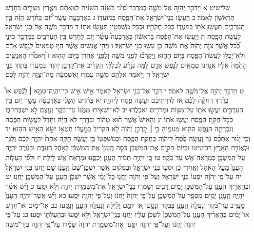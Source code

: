 \documentclass[twoside, openany, parskip=half, 11pt]{book}
\begin{document}
שלישיט א וַיְדַבֵּ֣ר יְהֹוָ֣ה אֶל־מֹשֶׁ֣ה בְמִדְבַּר־סִ֠ינַ֠י בַּשָּׁנָ֨ה הַשֵּׁנִ֜ית לְצֵאתָ֨ם מֵאֶ֧רֶץ מִצְרַ֛יִם בַּחֹ֥דֶשׁ הָרִאשׁ֖וֹן לֵאמֹֽר׃ ב וְיַעֲשׂ֧וּ בְנֵי־יִשְׂרָאֵ֛ל אֶת־הַפָּ֖סַח בְּמוֹעֲדֽוֹ׃ ג בְּאַרְבָּעָ֣ה עָשָֽׂר־י֠וֹם בַּחֹ֨דֶשׁ הַזֶּ֜ה בֵּ֧ין הָֽעַרְבַּ֛יִם תַּעֲשׂ֥וּ אֹת֖וֹ בְּמֹעֲד֑וֹ כְּכׇל־חֻקֹּתָ֥יו וּכְכׇל־מִשְׁפָּטָ֖יו תַּעֲשׂ֥וּ אֹתֽוֹ׃ ד וַיְדַבֵּ֥ר מֹשֶׁ֛ה אֶל־בְּנֵ֥י יִשְׂרָאֵ֖ל לַעֲשֹׂ֥ת הַפָּֽסַח׃ ה וַיַּעֲשׂ֣וּ אֶת־הַפֶּ֡סַח בָּרִאשׁ֡וֹן בְּאַרְבָּעָה֩ עָשָׂ֨ר י֥וֹם לַחֹ֛דֶשׁ בֵּ֥ין הָעַרְבַּ֖יִם בְּמִדְבַּ֣ר סִינָ֑י כְּ֠כֹ֠ל אֲשֶׁ֨ר צִוָּ֤ה יְהֹוָה֙ אֶת־מֹשֶׁ֔ה כֵּ֥ן עָשׂ֖וּ בְּנֵ֥י יִשְׂרָאֵֽל׃ ו וַיְהִ֣י אֲנָשִׁ֗ים אֲשֶׁ֨ר הָי֤וּ טְמֵאִים֙ לְנֶ֣פֶשׁ אָדָ֔ם וְלֹא־יָכְל֥וּ לַעֲשֹׂת־הַפֶּ֖סַח בַּיּ֣וֹם הַה֑וּא וַֽיִּקְרְב֞וּ לִפְנֵ֥י מֹשֶׁ֛ה וְלִפְנֵ֥י אַהֲרֹ֖ן בַּיּ֥וֹם הַהֽוּא׃ ז וַ֠יֹּאמְר֠וּ הָאֲנָשִׁ֤ים הָהֵ֙מָּה֙ אֵלָ֔יו אֲנַ֥חְנוּ טְמֵאִ֖ים לְנֶ֣פֶשׁ אָדָ֑ם לָ֣מָּה נִגָּרַ֗ע לְבִלְתִּ֨י הַקְרִ֜יב אֶת־קׇרְבַּ֤ן יְהֹוָה֙ בְּמֹ֣עֲד֔וֹ בְּת֖וֹךְ בְּנֵ֥י יִשְׂרָאֵֽל׃ ח וַיֹּ֥אמֶר אֲלֵהֶ֖ם מֹשֶׁ֑ה עִמְד֣וּ וְאֶשְׁמְעָ֔ה מַה־יְצַוֶּ֥ה יְהֹוָ֖ה לָכֶֽם׃

ט וַיְדַבֵּ֥ר יְהֹוָ֖ה אֶל־מֹשֶׁ֥ה לֵּאמֹֽר׃ י דַּבֵּ֛ר אֶל־בְּנֵ֥י יִשְׂרָאֵ֖ל לֵאמֹ֑ר אִ֣ישׁ אִ֣ישׁ כִּי־יִהְיֶֽה־טָמֵ֣א ׀ לָנֶ֡פֶשׁ אוֹ֩ בְדֶ֨רֶךְ רְחֹקָ֜הׄ לָכֶ֗ם א֚וֹ לְדֹרֹ֣תֵיכֶ֔ם וְעָ֥שָׂה פֶ֖סַח לַיהֹוָֽה׃ יא בַּחֹ֨דֶשׁ הַשֵּׁנִ֜י בְּאַרְבָּעָ֨ה עָשָׂ֥ר י֛וֹם בֵּ֥ין הָעַרְבַּ֖יִם יַעֲשׂ֣וּ אֹת֑וֹ עַל־מַצּ֥וֹת וּמְרֹרִ֖ים יֹאכְלֻֽהוּ׃ יב לֹֽא־יַשְׁאִ֤ירוּ מִמֶּ֙נּוּ֙ עַד־בֹּ֔קֶר וְעֶ֖צֶם לֹ֣א יִשְׁבְּרוּ־ב֑וֹ כְּכׇל־חֻקַּ֥ת הַפֶּ֖סַח יַעֲשׂ֥וּ אֹתֽוֹ׃ יג וְהָאִישׁ֩ אֲשֶׁר־ה֨וּא טָה֜וֹר וּבְדֶ֣רֶךְ לֹא־הָיָ֗ה וְחָדַל֙ לַעֲשׂ֣וֹת הַפֶּ֔סַח וְנִכְרְתָ֛ה הַנֶּ֥פֶשׁ הַהִ֖וא מֵֽעַמֶּ֑יהָ כִּ֣י ׀ קׇרְבַּ֣ן יְהֹוָ֗ה לֹ֤א הִקְרִיב֙ בְּמֹ֣עֲד֔וֹ חֶטְא֥וֹ יִשָּׂ֖א הָאִ֥ישׁ הַהֽוּא׃ יד וְכִֽי־יָג֨וּר אִתְּכֶ֜ם גֵּ֗ר וְעָ֤שָֽׂה פֶ֙סַח֙ לַֽיהֹוָ֔ה כְּחֻקַּ֥ת הַפֶּ֛סַח וּכְמִשְׁפָּט֖וֹ כֵּ֣ן יַעֲשֶׂ֑ה חֻקָּ֤ה אַחַת֙ יִהְיֶ֣ה לָכֶ֔ם וְלַגֵּ֖ר וּלְאֶזְרַ֥ח הָאָֽרֶץ׃
רביעיטו וּבְיוֹם֙ הָקִ֣ים אֶת־הַמִּשְׁכָּ֔ן כִּסָּ֤ה הֶֽעָנָן֙ אֶת־הַמִּשְׁכָּ֔ן לְאֹ֖הֶל הָעֵדֻ֑ת וּבָעֶ֜רֶב יִהְיֶ֧ה עַֽל־הַמִּשְׁכָּ֛ן כְּמַרְאֵה־אֵ֖שׁ עַד־בֹּֽקֶר׃ טז כֵּ֚ן יִהְיֶ֣ה תָמִ֔יד הֶעָנָ֖ן יְכַסֶּ֑נּוּ וּמַרְאֵה־אֵ֖שׁ לָֽיְלָה׃ יז וּלְפִ֞י הֵעָל֤וֹת הֶֽעָנָן֙ מֵעַ֣ל הָאֹ֔הֶל וְאַ֣חֲרֵי כֵ֔ן יִסְע֖וּ בְּנֵ֣י יִשְׂרָאֵ֑ל וּבִמְק֗וֹם אֲשֶׁ֤ר יִשְׁכׇּן־שָׁם֙ הֶֽעָנָ֔ן שָׁ֥ם יַחֲנ֖וּ בְּנֵ֥י יִשְׂרָאֵֽל׃ יח עַל־פִּ֣י יְהֹוָ֗ה יִסְעוּ֙ בְּנֵ֣י יִשְׂרָאֵ֔ל וְעַל־פִּ֥י יְהֹוָ֖ה יַחֲנ֑וּ כׇּל־יְמֵ֗י אֲשֶׁ֨ר יִשְׁכֹּ֧ן הֶעָנָ֛ן עַל־הַמִּשְׁכָּ֖ן יַחֲנֽוּ׃ יט וּבְהַאֲרִ֧יךְ הֶֽעָנָ֛ן עַל־הַמִּשְׁכָּ֖ן יָמִ֣ים רַבִּ֑ים וְשָׁמְר֧וּ בְנֵי־יִשְׂרָאֵ֛ל אֶת־מִשְׁמֶ֥רֶת יְהֹוָ֖ה וְלֹ֥א יִסָּֽעוּ׃ כ וְיֵ֞שׁ אֲשֶׁ֨ר יִהְיֶ֧ה הֶֽעָנָ֛ן יָמִ֥ים מִסְפָּ֖ר עַל־הַמִּשְׁכָּ֑ן עַל־פִּ֤י יְהֹוָה֙ יַחֲנ֔וּ וְעַל־פִּ֥י יְהֹוָ֖ה יִסָּֽעוּ׃ כא וְיֵ֞שׁ אֲשֶׁר־יִהְיֶ֤ה הֶֽעָנָן֙ מֵעֶ֣רֶב עַד־בֹּ֔קֶר וְנַעֲלָ֧ה הֶֽעָנָ֛ן בַּבֹּ֖קֶר וְנָסָ֑עוּ א֚וֹ יוֹמָ֣ם וָלַ֔יְלָה וְנַעֲלָ֥ה הֶעָנָ֖ן וְנָסָֽעוּ׃ כב אֽוֹ־יֹמַ֜יִם אוֹ־חֹ֣דֶשׁ אוֹ־יָמִ֗ים בְּהַאֲרִ֨יךְ הֶעָנָ֤ן עַל־הַמִּשְׁכָּן֙ לִשְׁכֹּ֣ן עָלָ֔יו יַחֲנ֥וּ בְנֵֽי־יִשְׂרָאֵ֖ל וְלֹ֣א יִסָּ֑עוּ וּבְהֵעָלֹת֖וֹ יִסָּֽעוּ׃ כג עַל־פִּ֤י יְהֹוָה֙ יַחֲנ֔וּ וְעַל־פִּ֥י יְהֹוָ֖ה יִסָּ֑עוּ אֶת־מִשְׁמֶ֤רֶת יְהֹוָה֙ שָׁמָ֔רוּ עַל־פִּ֥י יְהֹוָ֖ה בְּיַד־מֹשֶֽׁה׃
\end{document}
